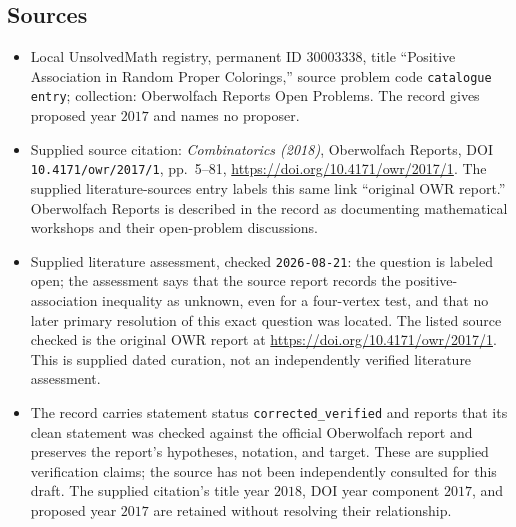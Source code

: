 \documentclass[11pt]{article}
\begin{document}
\subsection{Sources}
\begin{itemize}
\item Local UnsolvedMath registry, permanent ID \(30003338\), title ``Positive Association in Random Proper Colorings,'' source problem code \texttt{catalogue entry}; collection: Oberwolfach Reports Open Problems. The record gives proposed year \(2017\) and names no proposer.
\item Supplied source citation: \emph{Combinatorics (2018)}, Oberwolfach Reports, DOI \texttt{10.4171/owr/2017/1}, pp.~5--81, \url{https://doi.org/10.4171/owr/2017/1}. The supplied literature-sources entry labels this same link ``original OWR report.'' Oberwolfach Reports is described in the record as documenting mathematical workshops and their open-problem discussions.
\item Supplied literature assessment, checked \texttt{2026-08-21}: the question is labeled open; the assessment says that the source report records the positive-association inequality as unknown, even for a four-vertex test, and that no later primary resolution of this exact question was located. The listed source checked is the original OWR report at \url{https://doi.org/10.4171/owr/2017/1}. This is supplied dated curation, not an independently verified literature assessment.
\item The record carries statement status \texttt{corrected\_verified} and reports that its clean statement was checked against the official Oberwolfach report and preserves the report's hypotheses, notation, and target. These are supplied verification claims; the source has not been independently consulted for this draft. The supplied citation's title year \(2018\), DOI year component \(2017\), and proposed year \(2017\) are retained without resolving their relationship.
\end{itemize}
\end{document}
